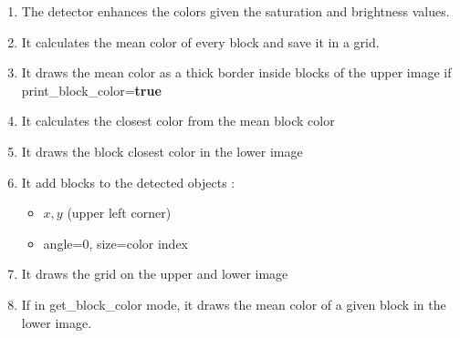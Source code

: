     \begin{enumerate}
        \item The detector enhances the colors given the saturation and 
                brightness values.
        \item It calculates the mean color of every block and save it
            in a grid.
        \item It draws the mean color as a thick border inside blocks of 
            the upper image if print\_block\_color={\bf true}
        \item It calculates the closest color from the mean block color
        \item It draws the block closest color in the lower image 


        \item It add blocks to the detected objects :
        \begin{itemize}
            \label{sec:cgd:algo:blockattributs}
            \item $x,y$ (upper left corner)
            \item angle=0, size=color index
        \end{itemize}
        \item It draws the grid on the upper and lower image
        \item If in get\_block\_color mode, it draws the mean color of a 
            given block in the lower image.
    \end{enumerate}


